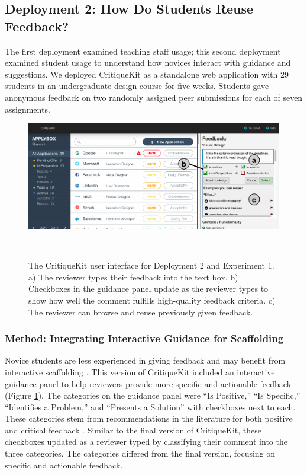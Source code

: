 \subsection{Deployment 2: How Do Students Reuse Feedback?}
The first deployment examined teaching staff usage; this second deployment examined student usage to understand how novices interact with guidance and suggestions. We deployed CritiqueKit as a standalone web application with 29 students in an undergraduate design course for five weeks. Students gave anonymous feedback on two randomly assigned peer submissions for each of seven assignments.

\begin{figure}[b!]
\centering
  \includegraphics[width=\textwidth]{critiquekit/figures/old_interface.png}
  \caption[The CritiqueKit user interface for Deployment 2 and Experiment 1.]{The CritiqueKit user interface for Deployment 2 and Experiment 1. a) The reviewer types their feedback into the text box. b) Checkboxes in the guidance panel update as the reviewer types to show how well the comment fulfills high-quality feedback criteria. c) The reviewer can browse and reuse previously given feedback.}~\label{fig:critiquekit_exp1}
\end{figure}

\subsubsection{Method: Integrating Interactive Guidance for Scaffolding}
Novice students are less experienced in giving feedback and may benefit from interactive scaffolding \cite{Reiser}. This version of CritiqueKit included an interactive guidance panel to help reviewers provide more specific and actionable feedback (Figure \ref{fig:critiquekit_exp1}). The categories on the guidance panel were ``Is Positive,'' ``Is Specific,'' ``Identifies a Problem,'' and ``Presents a Solution'' with checkboxes next to each. These categories stem from recommendations in the literature for both positive and critical feedback \cite{Kelley2013}. Similar to the final version of CritiqueKit, these checkboxes updated as a reviewer typed by classifying their comment into the three categories. The categories differed from the final version, focusing on specific and actionable feedback. 

